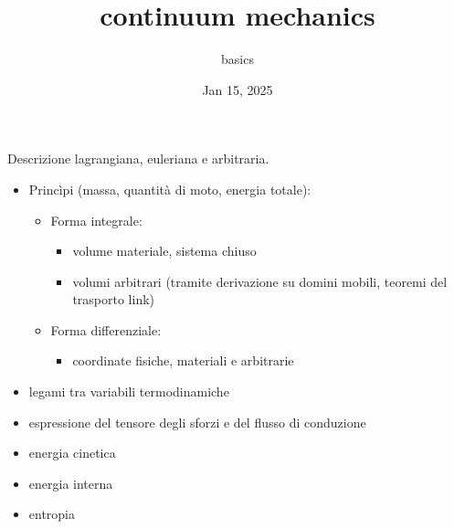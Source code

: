 \documentclass[letterpaper,10pt,english]{jupyterBook}
\title{continuum mechanics}
\date{Jan 15, 2025}
\author{basics}
\begin{document}
\pagestyle{empty}
\sphinxmaketitle
\pagestyle{plain}
\sphinxtableofcontents
\pagestyle{normal}
\label{\detokenize{intro::doc}}


\sphinxAtStartPar
{}
Descrizione lagrangiana, euleriana e arbitraria.

\sphinxAtStartPar
{}
\begin{itemize}
\item {} 
\sphinxAtStartPar
Princìpi (massa, quantità di moto, energia totale):
\begin{itemize}
\item {} 
\sphinxAtStartPar
Forma integrale:
\begin{itemize}
\item {} 
\sphinxAtStartPar
volume materiale, sistema chiuso

\item {} 
\sphinxAtStartPar
volumi arbitrari (tramite derivazione su domini mobili, teoremi del trasporto  link)

\end{itemize}

\item {} 
\sphinxAtStartPar
Forma differenziale:
\begin{itemize}
\item {} 
\sphinxAtStartPar
coordinate fisiche, materiali e arbitrarie

\end{itemize}

\end{itemize}

\end{itemize}

\sphinxAtStartPar
{}
\begin{itemize}
\item {} 
\sphinxAtStartPar
legami tra variabili termodinamiche

\item {} 
\sphinxAtStartPar
espressione del tensore degli sforzi e del flusso di conduzione

\end{itemize}

\sphinxAtStartPar
{}
\begin{itemize}
\item {} 
\sphinxAtStartPar
energia cinetica

\item {} 
\sphinxAtStartPar
energia interna

\item {} 
\sphinxAtStartPar
entropia

\end{itemize}
\end{document}
